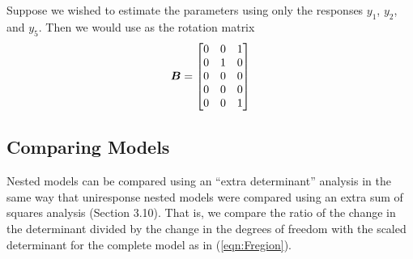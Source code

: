 \begin{example}\label{pin:5b}
Suppose we wished to estimate the
parameters using only the responses $y_{1}$, $y_{2}$, and $y_{5}$.
Then we would use as the rotation matrix
\begin{displaymath}
  {\boldsymbol B} =
  \begin{bmatrix}
    0 & 0 & 1\\
    0 & 1 & 0\\
    0 & 0 & 0\\
    0 & 0 & 0\\
    0 & 0 & 1
  \end{bmatrix}
\end{displaymath}
\end{example}

\subsection{Comparing Models}

Nested models can be compared using an
``extra determinant''
analysis in the same way that uniresponse nested models were compared
using an extra sum of squares analysis (Section 3.10).
That is, we compare the ratio of the change in the determinant divided
by the change in the degrees of freedom with the scaled determinant
for the complete model as in (\ref{eqn:Fregion}).

